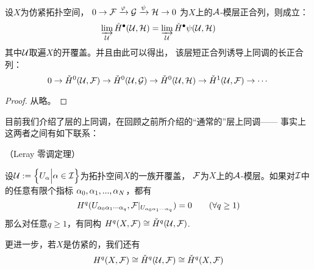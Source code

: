 \begin{thm}
设$X$为仿紧拓扑空间，
$0\to\mathcal{F}\xrightarrow{\varphi}\mathcal{G}\xrightarrow{\psi}\mathcal{H}\to 0$
为$X$上的$\mathcal{A}$-模层正合列，则成立：
$$
  \varinjlim_{\mathcal{U}}\check{H}^{\bullet}(\mathcal{U},\mathcal{H})
= \varinjlim_{\mathcal{U}}\check{H}^{\bullet}\psi(\mathcal{U},\mathcal{H})
$$
其中$\mathcal{U}$取遍$X$的开覆盖。并且由此可以得出，
该层短正合列诱导\Cech 上同调的长正合列：
$$
 0\to\check{H}^0(\mathcal{U},\mathcal{F})
  \to\check{H}^0(\mathcal{U},\mathcal{G})
  \to\check{H}^0(\mathcal{U},\mathcal{H})
  \to\check{H}^1(\mathcal{U},\mathcal{F})
  \to\cdots
$$
\end{thm}

\begin{proof}
从略。
\end{proof}


目前我们介绍了层的\Cech 上同调，在回顾之前所介绍的“通常的”层上同调——
事实上这两者之间有如下联系：

\begin{thm}（Leray 零调定理）

设$\mathcal{U}:=\Big\{ U_\alpha \Big| \alpha\in\mathcal{I} \Big\}$为拓扑空间$X$的一族开覆盖，
$\mathcal{F}$为$X$上的$\mathcal{A}$-模层。如果对$\mathcal{I}$中的任意有限个指标
$\alpha_0,\alpha_1,...,\alpha_N$，都有
$$
  H^q(U_{\alpha_0\alpha_1\cdots\alpha_q},
     \mathcal{F}|_{U_{\alpha_0\alpha_1\cdots\alpha_q}})
=0\qquad
(\forall q\geq 1)
$$
那么对任意$q\geq 1$，有同构
$H^q(X,\mathcal{F})\cong \check{H}^q(\mathcal{U},\mathcal{F})$.

更进一步，若$X$是仿紧的，我们还有
$$H^q(X,\mathcal{F})\cong \check{H}^q(\mathcal{U},\mathcal{F})
\cong\check{H}^q(X,\mathcal{F})$$
\end{thm}


